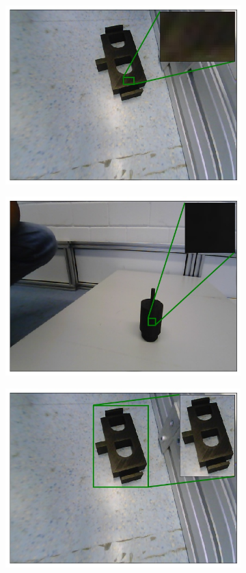 	\begin{figure}[h]
		\centering
		\begin{subfigure}{.4\textwidth}
			\centering
			\includegraphics[width=.9\linewidth]{images/em_01_context_l}
			\caption{}
			\label{Fig:em01l}
		\end{subfigure}
		\begin{subfigure}{.4\textwidth}
			\centering
			\includegraphics[width=.9\linewidth]{images/motor_context_l}
			\caption{}
			\label{Fig:motorl}
		\end{subfigure}
		\begin{subfigure}{.4\textwidth}
			\centering
			\includegraphics[width=.9\linewidth]{images/em_01_context_g}

\end{subfigure}
\end{figure}
